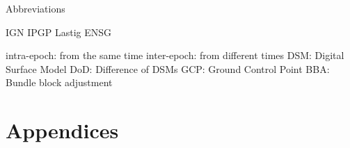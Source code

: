 \documentclass[a4paper,11pt,twoside]{ThesisStyle}
\begin{document}
\dominitoc
\tableofcontents



\mainmatter

Abbreviations

IGN
IPGP
Lastig
ENSG

intra-epoch: from the same time
inter-epoch: from different times
DSM: Digital Surface Model
DoD: Difference of DSMs
GCP: Ground Control Point
BBA: Bundle block adjustment











\appendix

\cleardoublepage
\mtcaddpart[Appendices]
\part*{Appendices}






\end{document}
